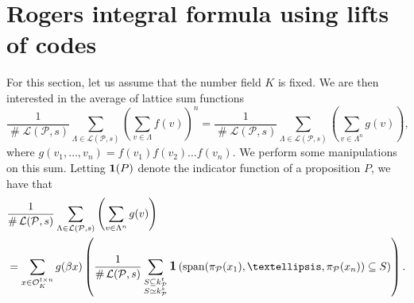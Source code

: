 \documentclass{amsart}
\DeclareMathOperator{\card}{\texttt{\#}}
\DeclareMathOperator{\spant}{span}
\DeclareMathOperator{\ind}{\mathlarger{\mathbf{1}}}
\begin{document}
\section{Rogers integral formula using lifts of codes}
  \label{se:rogers}

For this section, let us assume that the number field $K$ is fixed. 
We are then interested in the average of lattice sum functions
\begin{equation}
\frac{1}{\card \mathcal{L}(\mathcal{P},s)}
\sum_{ \Lambda \in \mathcal{L}(\mathcal{P},s)} 
\left(\sum_{v \in \Lambda} f(v)\right)^{n}  = 
\frac{1}{\card \mathcal{L}(\mathcal{P},s)} 
\sum_{ \Lambda \in \mathcal{L}(\mathcal{P},s)} 
\left( \sum_{v \in \Lambda^{n}} g(v)\right),
\label{eq:nthmoment}
\end{equation}
where $g(v_1,\dots,v_n)= f(v_1)f(v_2)\dots f(v_n)$.
We perform some manipulations on this sum. Letting $\ind(P)$ denote the indicator function of a proposition $P$, we have that 
\begin{align}
& 
\frac{1}{\card \mathcal{L}(\mathcal{P},s)} \sum_{\Lambda \in \mathcal{L}(\mathcal{P},s)}\left( \sum_{v \in \Lambda^{n}} g(v)\right) 
\\
& = 
\sum_{x \in \mathcal{O}_K^{t \times n} }
g( \beta x)
\left(
\frac{1}{\card \mathcal{L}(\mathcal{P},s)} 
\sum_{\substack{  S \subseteq k_\mathcal{P}^{t} \\  S \simeq k_{\mathcal{P}}^{s} } } 
\ind\left(
\spant
( \pi_{\mathcal{P}}(x_1),\dots,\pi_{\mathcal{P}}(x_n)) \subseteq S
\right) \right). \\
\label{eq:prepoission}
\end{align}
\end{document}
